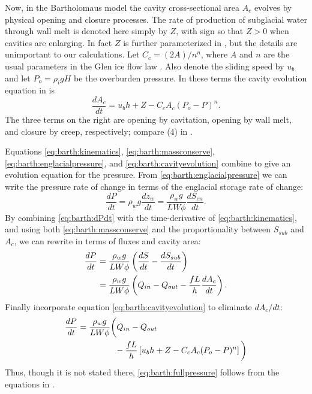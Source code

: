 \documentclass[twocolumn,letterpaper]{igs}
\begin{document}
Now, in the Bartholomaus model the cavity cross-sectional area $A_c$ evolves by physical opening and closure processes.  The rate of production of subglacial water through wall melt is denoted here simply by $Z$, with sign so that $Z>0$ when cavities are enlarging.  In fact $Z$ is further parameterized in \cite{Bartholomausetal2011}, but the details are unimportant to our calculations.  Let $C_c = (2 A)/n^n$, where $A$ and $n$ are the usual parameters in the Glen ice flow law \citep{CuffeyPaterson}.  Also denote the sliding speed by $u_b$ and let $P_o=\rho_i g H$ be the overburden pressure.  In these terms the cavity evolution equation in \cite{Bartholomausetal2011} is
\begin{equation}
\frac{dA_c}{dt} = u_b h + Z - C_c A_c (P_o-P)^n.  \label{eq:barth:cavityevolution}
\end{equation}
The three terms on the right are opening by cavitation, opening by wall melt, and closure by creep, respectively; compare (4) in \cite{Bartholomausetal2011}.

Equations \eqref{eq:barth:kinematics}, \eqref{eq:barth:massconserve}, \eqref{eq:barth:englacialpressure}, and \eqref{eq:barth:cavityevolution} combine to give an evolution equation for the pressure.  From \eqref{eq:barth:englacialpressure} we can write the pressure rate of change in terms of the englacial storage rate of change:
\begin{equation}
\frac{dP}{dt} = \rho_w g \frac{dz_w}{dt} = \frac{\rho_w g}{L W \phi} \frac{d S_{en}}{dt}. \label{eq:barth:dPdt}
\end{equation}
By combining \eqref{eq:barth:dPdt} with  the time-derivative of \eqref{eq:barth:kinematics}, and using both \eqref{eq:barth:massconserve} and the proportionality between $S_{sub}$ and $A_c$, we can rewrite in terms of fluxes and cavity area:
\begin{align}
\frac{dP}{dt} &= \frac{\rho_w g}{L W \phi} \left(\frac{d S}{dt} - \frac{d S_{sub}}{dt}\right) \\
&= \frac{\rho_w g}{L W \phi} \left(Q_{in} - Q_{out} - \frac{f L }{h} \frac{d A_c}{dt}\right). \notag
\end{align}
Finally incorporate equation \eqref{eq:barth:cavityevolution} to eliminate $dA_c/dt$:
\begin{align}
&\frac{dP}{dt} = \frac{\rho_w g}{L W \phi} \bigg(Q_{in} - Q_{out} \label{eq:barth:fullpressure} \\
&\qquad \qquad \qquad - \frac{f L }{h} \left[u_b h + Z - C_c A_c (P_o-P)^n\right]\bigg) \notag
\end{align}
Thus, though it is not stated there, \eqref{eq:barth:fullpressure} follows from the equations in \cite{Bartholomausetal2011}.
\end{document}

